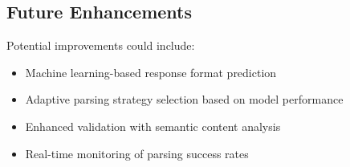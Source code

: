 \documentclass[11pt,a4paper]{article}
\begin{document}
\subsection{Future Enhancements}

Potential improvements could include:
\begin{itemize}
    \item Machine learning-based response format prediction
    \item Adaptive parsing strategy selection based on model performance
    \item Enhanced validation with semantic content analysis
    \item Real-time monitoring of parsing success rates
\end{itemize}
\end{document}
